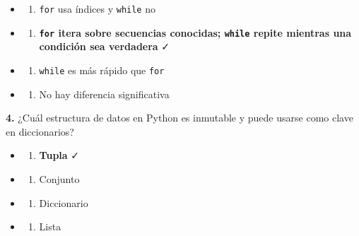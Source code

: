 \documentclass[
  9pt,
]{article}
\providecommand{\tightlist}{%
  \setlength{\itemsep}{0pt}\setlength{\parskip}{0pt}}
\begin{document}
\begin{itemize}
\tightlist
\item
  \begin{enumerate}
  \def\labelenumi{\Alph{enumi})}
  \tightlist
  \item
    \texttt{for} usa índices y \texttt{while} no
  \end{enumerate}
\item
  \begin{enumerate}
  \def\labelenumi{\Alph{enumi})}
  \setcounter{enumi}{1}
  \tightlist
  \item
    \textbf{\texttt{for} itera sobre secuencias conocidas;
    \texttt{while} repite mientras una condición sea verdadera} ✓
  \end{enumerate}
\item
  \begin{enumerate}
  \def\labelenumi{\Alph{enumi})}
  \setcounter{enumi}{2}
  \tightlist
  \item
    \texttt{while} es más rápido que \texttt{for}
  \end{enumerate}
\item
  \begin{enumerate}
  \def\labelenumi{\Alph{enumi})}
  \setcounter{enumi}{3}
  \tightlist
  \item
    No hay diferencia significativa
  \end{enumerate}
\end{itemize}

\textbf{4.} ¿Cuál estructura de datos en Python es inmutable y puede
usarse como clave en diccionarios?

\begin{itemize}
\tightlist
\item
  \begin{enumerate}
  \def\labelenumi{\Alph{enumi})}
  \tightlist
  \item
    \textbf{Tupla} ✓
  \end{enumerate}
\item
  \begin{enumerate}
  \def\labelenumi{\Alph{enumi})}
  \setcounter{enumi}{1}
  \tightlist
  \item
    Conjunto
  \end{enumerate}
\item
  \begin{enumerate}
  \def\labelenumi{\Alph{enumi})}
  \setcounter{enumi}{2}
  \tightlist
  \item
    Diccionario
  \end{enumerate}
\item
  \begin{enumerate}
  \def\labelenumi{\Alph{enumi})}
  \setcounter{enumi}{3}
  \tightlist
  \item
    Lista
  \end{enumerate}
\end{itemize}
\end{document}
